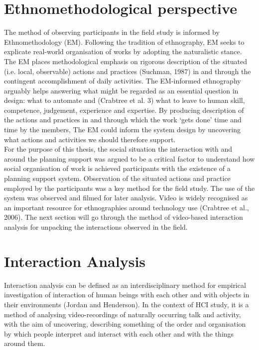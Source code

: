 \section{Ethnomethodological perspective}
The method of observing participants in the field study is informed by Ethnomethodology (EM). Following the tradition of ethnography, EM seeks to explicate real-world organisation of works by adopting the naturalistic stance. The EM places methodological emphasis on rigorous description of the situated (i.e. local, observable) actions and practices (Suchman, 1987) in and through the contingent accomplishment of daily activities. The EM-informed ethnography arguably helps answering what might be regarded as an essential question in design: what to automate and (Crabtree et al. 3) what to leave to human skill, competence, judgement, experience and expertise. By producing description of the actions and practices in and through which the work `gets done' time and time by the members, The EM could inform the system design by uncovering what actions and activities we should therefore support.\\

For the purpose of this thesis, the social situation the interaction with and around the planning support was argued to be a critical factor to understand how social organisation of work is achieved participants with the existence of a planning support system. Observation of the situated actions and practice employed by the participants was a key method for the field study. The use of the system was observed and filmed for later analysis. Video is widely recognised as an important resource for ethnographies around technology use (Crabtree et al., 2006). The next section will go through the method of video-based interaction analysis for unpacking the interactions observed in the field. \\

\section{Interaction Analysis}
Interaction analysis can be defined as an interdisciplinary method for empirical investigation of interaction of human beings with each other and with objects in their environments (Jordan and Henderson). In the context of HCI study, it is a method of analysing video-recordings of naturally occurring talk and activity, with the aim of uncovering, describing something of the order and organisation by which people interpret and interact with each other and with the things around them.\\

